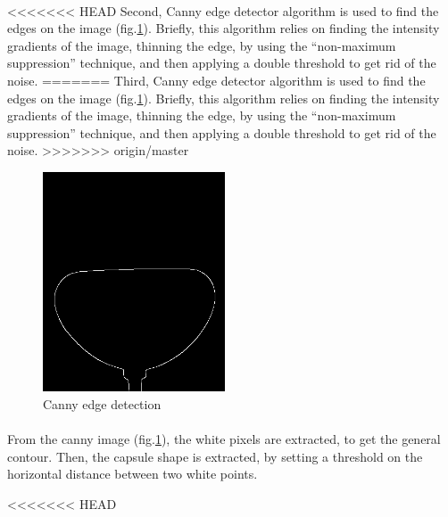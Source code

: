 \paragraph{}
<<<<<<< HEAD
Second, Canny edge detector algorithm\cite{canny} is used to find the edges on the image (fig.\ref{fig:canny}). Briefly, this algorithm relies on finding the intensity gradients of the image, thinning the edge, by using the "`non-maximum suppression"' technique, and then applying a double threshold to get rid of the noise.
=======
Third, Canny edge detector algorithm\cite{canny} is used to find the edges on the image (fig.\ref{fig:canny}). Briefly, this algorithm relies on finding the intensity gradients of the image, thinning the edge, by using the "`non-maximum suppression"' technique, and then applying a double threshold to get rid of the noise.
>>>>>>> origin/master
\begin{figure}[H] %
	\centering%
  \includegraphics[width=0.48\textwidth]{figures/Chapter_1/canny.png}
	\caption{Canny edge detection}
	\label{fig:canny}
\end{figure}
\paragraph{}
From the canny image (fig.\ref{fig:canny}), the white pixels are extracted, to get the general contour. Then, the capsule shape is extracted, by setting a threshold on the horizontal distance between two white points.

<<<<<<< HEAD

